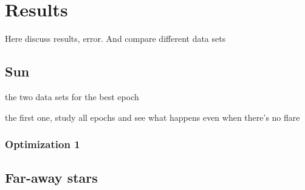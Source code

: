 \chapter{Results}

Here discuss results, error. And compare different data sets

\section{Sun}

the two data sets for the best epoch

the first one, study all epochs and see what happens even when there's no flare

\subsection{Optimization 1}

\section{Far-away stars}
